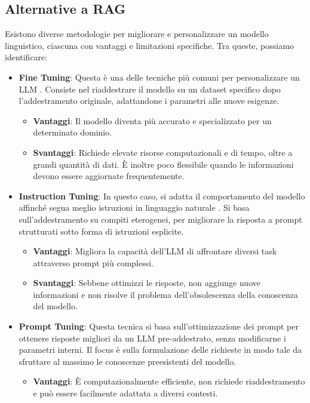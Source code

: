 \subsection{Alternative a RAG}
Esistono diverse metodologie per migliorare e personalizzare un modello linguistico, ciascuna con vantaggi e limitazioni specifiche. Tra queste, possiamo identificare:
\begin{itemize}
    \item \textbf{Fine Tuning}: Questa è una delle tecniche più comuni per personalizzare un LLM \cite{lu2024finetuninglargelanguagemodels}. Consiste nel riaddestrare il modello su un dataset specifico dopo l'addestramento originale, adattandone i parametri alle nuove esigenze.
        \begin{itemize}
            \item \textbf{Vantaggi}: Il modello diventa più accurato e specializzato per un determinato dominio.
            \item \textbf{Svantaggi}: Richiede elevate risorse computazionali e di tempo, oltre a grandi quantità di dati. È inoltre poco flessibile quando le informazioni devono essere aggiornate frequentemente.
        \end{itemize}
    \item \textbf{Instruction Tuning}: In questo caso, si adatta il comportamento del modello affinché segua meglio istruzioni in linguaggio naturale \cite{ouyang2022traininglanguagemodelsfollow}. Si basa sull'addestramento su compiti eterogenei, per migliorare la risposta a prompt strutturati sotto forma di istruzioni esplicite.
        \begin{itemize}
            \item \textbf{Vantaggi}: Migliora la capacità dell'LLM di affrontare diversi task attraverso prompt più complessi.
            \item \textbf{Svantaggi}: Sebbene ottimizzi le risposte, non aggiunge nuove informazioni e non risolve il problema dell'obsolescenza della conoscenza del modello.
        \end{itemize}
    \item \textbf{Prompt Tuning}: Questa tecnica si basa sull'ottimizzazione dei prompt per ottenere risposte migliori da un LLM pre-addestrato, senza modificarne i parametri interni. Il focus è sulla formulazione delle richieste in modo tale da sfruttare al massimo le conoscenze preesistenti del modello.
        \begin{itemize}
            \item \textbf{Vantaggi}: È computazionalmente efficiente, non richiede riaddestramento e può essere facilmente adattata a diversi contesti.

\end{itemize}
\end{itemize}
